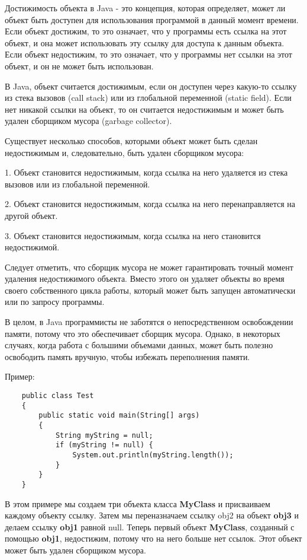 \documentclass[12pt, a4paper]{book}%
\begin{document}
{Достижимость объекта в Java - это концепция, которая определяет, может ли объект быть доступен для использования программой в данный момент времени. Если объект достижим, то это означает, что у программы есть ссылка на этот объект, и она может использовать эту ссылку для доступа к данным объекта. Если объект недостижим, то это означает, что у программы нет ссылки на этот объект, и он не может быть использован.

В Java, объект считается достижимым, если он доступен через какую-то ссылку из стека вызовов (call stack) или из глобальной переменной (static field). Если нет никакой ссылки на объект, то он считается недостижимым и может быть удален сборщиком мусора (garbage collector).

Существует несколько способов, которыми объект может быть сделан недостижимым и, следовательно, быть удален сборщиком мусора:

1. Объект становится недостижимым, когда ссылка на него удаляется из стека вызовов или из глобальной переменной.

2. Объект становится недостижимым, когда ссылка на него перенаправляется на другой объект.

3. Объект становится недостижимым, когда ссылка на него становится недостижимой.

Следует отметить, что сборщик мусора не может гарантировать точный момент удаления недостижимого объекта. Вместо этого он удаляет объекты во время своего собственного цикла работы, который может быть запущен автоматически или по запросу программы.

В целом, в Java программисты не заботятся о непосредственном освобождении памяти, потому что это обеспечивает сборщик мусора. Однако, в некоторых случаях, когда работа с большими объемами данных, может быть полезно освободить память вручную, чтобы избежать переполнения памяти.

Пример:
\begin{lstlisting}
    public class Test
    {
        public static void main(String[] args)
        {
            String myString = null;
            if (myString != null) {
                System.out.println(myString.length());
            }
        }
    }
\end{lstlisting}
В этом примере мы создаем три объекта класса {\bf MyClass} и присваиваем каждому объекту ссылку. Затем мы переназначаем ссылку obj2 на объект {\bf obj3} и делаем ссылку {\bf obj1} равной null. Теперь первый объект {\bf MyClass}, созданный с помощью {\bf obj1}, недостижим, потому что на него больше нет ссылок. Этот объект может быть удален сборщиком мусора.

}
\end{document}
